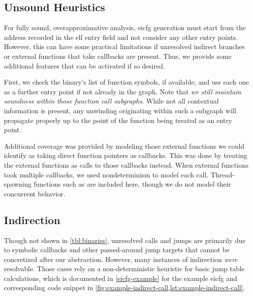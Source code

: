 \subsection{Unsound Heuristics}
\begin{comment}
  In total, we achieved an average of \coveredpercent\ coverage of the counted instructions across the \satisfactorybins\ satisfactory (\cutoffpercent\ coverage) binaries.
  Ideally, this number would be the ratio of reached instructions to actual reachable instructions.
  However, we do not have a ground truth for the latter number. Therefore, we approximate by comparing the number of reached instructions with the raw line count provided by \inlineasm{objdump}. This ratio gives an \emph{indication} of how much of each binary was covered.

  The coverage was achieved in several steps for each binary.
\end{comment}
For fully sound, overapproximative analysis, \ac{eicfg} generation must start from the address recorded in the \ac{elf} entry field and not consider any other entry points.
However, this can have some practical limitations if unresolved indirect branches or external functions that take callbacks are present.
Thus, we provide some additional features that can be activated if so desired.

First, we check the binary's list of function symbols, if available, and use each one as a further entry point if not already in the graph.
Note that \emph{we still maintain soundness within those function call subgraphs}.
While not all contextual information is present, any unwinding originating within such a subgraph will propagate properly up to the point of the function being treated as an entry point.

Additional coverage was provided by modeling those external functions we could identify as taking direct function pointers as callbacks.
This was done by treating the external functions as calls to those callbacks instead.
When external functions took multiple callbacks, we used nondeterminism to model each call.
Thread-spawning functions such as  are included here, though we do not model their concurrent behavior.

\subsection{Indirection}\label{sec:indirection}
Though not shown in \cref{tbl:binaries}, unresolved calls and jumps are primarily due to symbolic callbacks and other passed-around jump targets that cannot be concretized after our abstraction.
However, many instances of indirection \emph{were} resolvable.%
Those cases rely on a non-deterministic heuristic for basic jump table calculations, which is documented in \cref{eicfg-example} for the example \ac{eicfg} and corresponding code snippet in \cref{fig:example-indirect-call,lst:example-indirect-call}.

